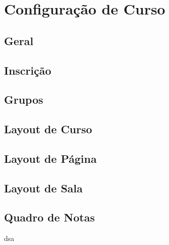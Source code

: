 \chapter{Configuração de Curso}

\section{Geral}

\section{Inscrição}

\section{Grupos}

\section{Layout de Curso}

\section{Layout de Página}

\section{Layout de Sala}

\section{Quadro de Notas}
dsa